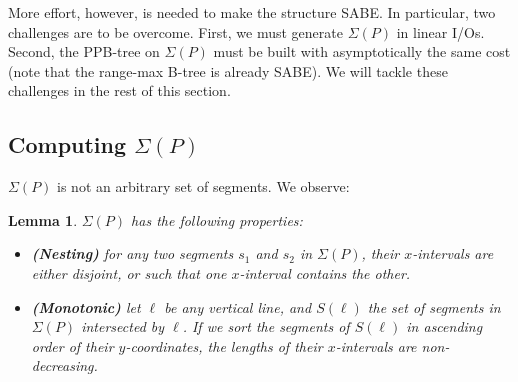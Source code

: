 \documentclass{sig-alternate}
\newtheorem{lemma}{Lemma}
\renewcommand{\(}{\left(}
\renewcommand{\)}{\right)}
\begin{document}
More effort, however, is needed to make the structure SABE. In particular, two challenges are to be overcome. First, we must generate $\Sigma(P)$ in linear
I/Os. Second, the PPB-tree on $\Sigma(P)$ must be built with asymptotically the same cost (note that the range-max B-tree is already SABE). We will tackle these challenges in the rest of this section.

\subsection{Computing {\large \boldmath$\Sigma(P)$}} \label{sec:topopen-genseg}


$\Sigma(P)$ is not an arbitrary set of segments. We observe:

\begin{lemma} \label{lmm:topopen-properties}
	$\Sigma(P)$ has the following properties:
	\begin{itemize}
    \item {\bf (Nesting)} for any two segments $s_1$ and $s_2$ in $\Sigma(P)$,
    their $x$-intervals are either disjoint, or such that one $x$-interval
    contains the other.

    \item {\bf (Monotonic)} let $\ell$ be any vertical line, and $S(\ell)$ the
    set of segments in $\Sigma(P)$ intersected by $\ell$. If we sort the
    segments of $S(\ell)$ in ascending order of their $y$-coordinates, the lengths of
    their $x$-intervals are non-decreasing.
	\end{itemize}
\end{lemma}
\end{document}

